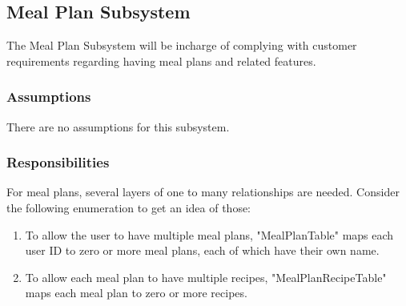 \subsection{Meal Plan Subsystem}\label{section:db.2}
The Meal Plan Subsystem will be incharge of complying with customer requirements regarding having meal plans and related features.


\subsubsection{Assumptions}
There are no assumptions for this subsystem.

\subsubsection{Responsibilities}
For meal plans, several layers of one to many relationships are needed.  Consider the following enumeration to get an idea of those:
\begin{enumerate}
    \item To allow the user to have multiple meal plans, "MealPlanTable" maps each user ID to zero or more meal plans, each of which have their own name.
    \item To allow each meal plan to have multiple recipes, "MealPlanRecipeTable" maps each meal plan to zero or more recipes.
\end{enumerate}

